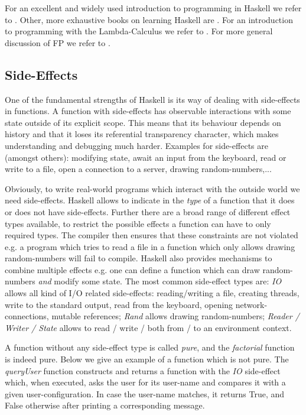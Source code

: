 For an excellent and widely used introduction to programming in Haskell we refer to \cite{hutton_programming_2016}. Other, more exhaustive books on learning Haskell are \cite{allen_haskell_2016}. For an introduction to programming with the Lambda-Calculus we refer to \cite{michaelson_introduction_2011}. For more general discussion of FP we refer to \cite{hughes_why_1989,maclennan_functional_1990}.

\subsection{Side-Effects}
One of the fundamental strengths of Haskell is its way of dealing with side-effects in functions. A function with side-effects has observable interactions with some state outside of its explicit scope. This means that its behaviour depends on history and that it loses its referential transparency character, which makes understanding and debugging much harder. Examples for side-effects are (amongst others): modifying state, await an input from the keyboard, read or write to a file, open a connection to a server, drawing random-numbers,...

Obviously, to write real-world programs which interact with the outside world we need side-effects. Haskell allows to indicate in the \textit{type} of a function that it does or does not have side-effects. Further there are a broad range of different effect types available, to restrict the possible effects a function can have to only required types. The compiler then ensures that these constraints are not violated e.g. a program which tries to read a file in a function which only allows drawing random-numbers will fail to compile. Haskell also provides mechanisms to combine multiple effects e.g. one can define a function which can draw random-numbers \textit{and} modify some state. The most common side-effect types are: \textit{IO} allows all kind of I/O related side-effects: reading/writing a file, creating threads, write to the standard output, read from the keyboard, opening network-connections, mutable references; \textit{Rand}  allows drawing random-numbers; \textit{Reader / Writer / State} allows to read / write / both from / to an environment context.

A function without any side-effect type is called \textit{pure}, and the \textit{factorial} function is indeed pure. Below we give an example of a function which is not pure. The \textit{queryUser} function constructs and returns a function with the \textit{IO} side-effect which, when executed, asks the user for its user-name and compares it with a given user-configuration. In case the user-name matches, it returns True, and False otherwise after printing a corresponding message. 

